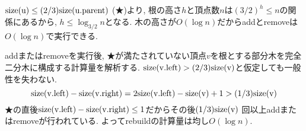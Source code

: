\subsection{}
$\rm{size}(u) \leq (2/3) \rm{size}(u.parent)$
(★)より, 根の高さ$h$と頂点数$n$は$(3/2)^{h} \leq n$の関係にあるから, $h \leq \log_{3/2} n$となる.
木の高さが$O(\log n)$だからaddとremoveは$O(\log n)$で実行できる.


addまたはremoveを実行後, ★が満たされていない頂点$v$を根とする部分木を完全二分木に構成する計算量を解析する.
$\rm{size}(v.left) > (2/3) \rm{size}(v)$と仮定しても一般性を失わない.
$$\rm{size}(v.left) - \rm{size}(v.right) = 2\rm{size}(v.left) - \rm{size}(v) + 1 > (1/3) \rm{size}(v)$$
★の直後$\rm{size} (v.left) -\rm{size} (v.right) \leq 1$だからその後$(1/3) \rm{size}(v)$ 回以上addまたはremoveが行われている.
よってrebuildの計算量は均し$O(\log n)$.
